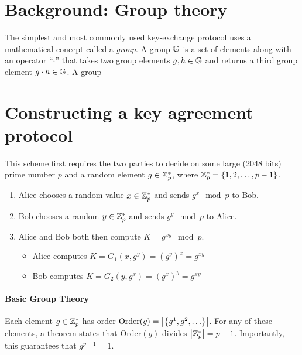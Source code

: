 \section{Background: Group theory}
The simplest and most commonly used key-exchange protocol uses
a mathematical concept called a \emph{group}.
A group $\mathbb{G}$ is a set of elements along with an operator
``$\cdot$'' that takes two group elements $g, h \in \mathbb{G}$
and returns a third group element $g \cdot h \in \mathbb{G}$.
A group 





\section{Constructing a key agreement protocol}

This scheme first requires the two parties to decide on some large (2048 bits) prime number $p$ and a random element $g \in \mathbb{Z}_p^*$, where $\mathbb{Z}_p^* = \left\{ 1, 2, \ldots, p-1 \right\}$. 

\begin{enumerate}[noitemsep]
	\item Alice chooses a random value $x \in \mathbb{Z}_p^*$ and sends $g^x \mod p$ to Bob.
	\item Bob chooses a random $y \in \mathbb{Z}_p^*$ and sends $g^y \mod p$ to Alice.
	\item Alice and Bob both then compute $K = g^{xy} \mod p$.
		\begin{itemize}
			\item Alice computes $K = G_1(x, g^y) = (g^y)^x = g^{xy}$
			\item Bob computes $K = G_2(y, g^x) = (g^x)^y = g^{xy}$
		\end{itemize}
\end{enumerate}


\paragraph{Basic Group Theory}
Each element $g \in \mathbb{Z}_p^*$ has order $\text{Order}(g) = \left| \left\{ g^1, g^2, \ldots  \right\} \right|$. For any of these elements, a theorem states that $\text{Order}(g)$ divides $\left| \mathbb{Z}_p^* \right| = p-1$. Importantly, this guarantees that $g^{p-1} = 1$.


